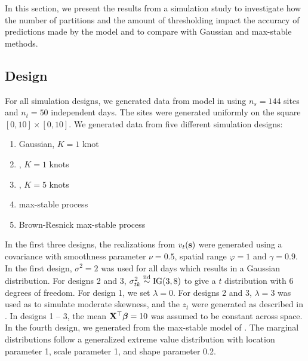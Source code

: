 In this section, we present the results from a simulation study to investigate how the number of partitions and the amount of thresholding impact the accuracy of predictions made by the model and to compare with Gaussian and max-stable methods.

\subsection{Design}\label{sts:simdesign}

For all simulation designs, we generated data from model  in  using $n_s=144$ sites and $n_t=50$ independent days.
The sites were generated uniformly on the square $[0, 10] \times [0, 10]$.
We generated data from five different simulation designs:
\begin{enumerate}
  \item Gaussian, $K=1$ knot
  \item \Skewt{}, $K=1$ knots
  \item \Skewt{}, $K=5$ knots
  \item \citet{Reich2012} max-stable process %
  \item Brown-Resnick max-stable process \citep{Kabluchko2009} %
\end{enumerate}
In the first three designs, the realizations from $v_t(\mathbf{s})$ were generated using a \Matern covariance with smoothness parameter $\nu = 0.5$, spatial range $\varphi = 1$ and $\gamma = 0.9$.
In the first design, $\sigma^2 = 2$ was used for all days which results in a Gaussian distribution.
For designs 2 and 3, $\sigma^2_{tk} \stackrel{\mathrm{iid}}{\sim} \text{IG}(3, 8)$ to give a $t$ distribution with 6 degrees of freedom.
For design 1, we set $\lambda = 0$.
For designs 2 and 3, $\lambda = 3$ was used as to simulate moderate skewness, and the $z_t$ were generated as described in .
In designs 1 -- 3, the mean $\mathbf{X}^\top \mbox{\boldmath $\beta$} = 10$ was assumed to be constant across space.
In the fourth design, we generated from the max-stable model of \citet{Reich2012}.
The marginal distributions follow a generalized extreme value distribution with location parameter 1, scale parameter 1, and shape parameter 0.2.
